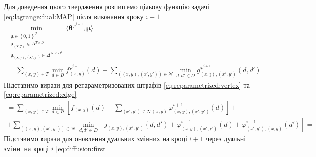Для доведення цього твердження розпишемо цільову функцію задачі
\eqref{eq:lagrange:dual:MAP} після виконання кроку $i + 1$
\begin{equation*}
\begin{gathered}
    \min \limits_{\substack{\pmb{\mu} \in \left\{ 0, 1 \right\}^{\mathcal{I}} \\
                            \pmb{\mu_{\left(x, y \right)}} \in \Delta^{T \times D} \\
                            \pmb{\mu_{\left(x, y \right), \left(x', y' \right)}} \in
                                \Delta^{\mathcal{N} \times D^2}}}
        \langle \pmb{\theta}^{\varphi^{i + 1}}, \pmb{\mu} \rangle = \\
    = \sum \limits_{\left(x, y \right) \in T}
        \min \limits_{d \in D}
            f_{\left(x, y \right)}^{\varphi^{i + 1}} \left( d \right) +
    \sum \limits_{\left( \left(x, y \right), \left(x', y' \right) \right) \in \mathcal{N}}
        \min \limits_{d, d' \in D}
            g_{\left(x, y \right), \left(x', y' \right)}^{\varphi^{i + 1}}
                \left( d, d' \right) =
\end{gathered}
\end{equation*}
Підставимо вирази для репараметризованих штрафів
\eqref{eq:reparametrized:vertex}
та \eqref{eq:reparametrized:edge}
\begin{equation*}
\begin{gathered}
    = \sum \limits_{\left(x, y \right) \in T}
        \min \limits_{d \in D} \left[
            f_{\left(x, y \right)} \left( d \right) -
            \sum \limits_{\left(x', y' \right) \in \mathcal{N} \left(x, y \right)}
                \varphi_{\left(x, y \right), \left(x', y' \right)}^{i + 1}
                    \left( d \right)
        \right] + \\
    + \sum \limits_{\left(\left(x, y \right), \left(x', y' \right) \right) \in \mathcal{N}}
        \min \limits_{d, d' \in D} \left[
            g_{\left(x, y \right), \left(x', y' \right)} \left(d, d' \right) +
            \varphi_{\left(x, y \right), \left(x', y' \right)}^{i + 1}
                \left( d \right) +
            \varphi_{\left(x', y' \right), \left(x, y \right)}^{i + 1}
                \left( d' \right)
        \right] =
\end{gathered}
\end{equation*}
Підставимо вирази для оновлення дуальних змінних на кроці $i + 1$
через дуальні змінні на кроці $i$ \eqref{eq:diffusion:first}
